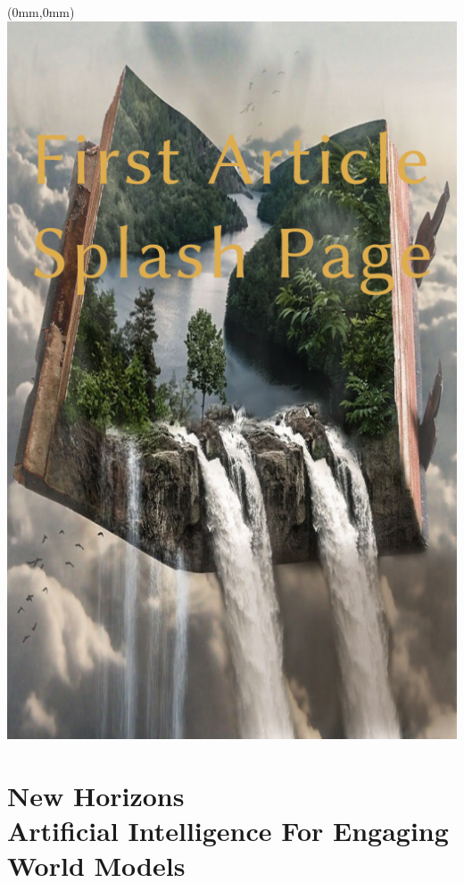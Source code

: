 \documentclass[11.75pt,openany,final]{memoir}
\begin{document}
\thispagestyle{empty} %
\newpage
\chapter*{}
\begin{textblock*}{70.9mm}(0mm,0mm)
\includegraphics[width=\paperwidth]{./media/images/article_splash}
\end{textblock*}
\clearpage
\chapter{New Horizons\\ \small{Artificial Intelligence For Engaging World Models}}

\end{document}
